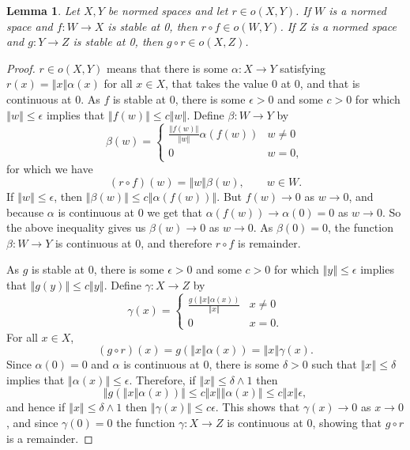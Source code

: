 \documentclass{article}
\newcommand{\norm}[1]{\left\Vert #1 \right\Vert}
\newtheorem{lemma}[theorem]{Lemma}
\theoremstyle{definition}
\begin{document}
\begin{lemma}
Let $X,Y$ be normed spaces and let $r \in o(X,Y)$. 
If $W$ is a normed space and $f:W \to X$ is stable at 0, then $r \circ f \in o(W,Y)$. If $Z$ is a normed space
and $g:Y \to Z$ is stable at 0, then $g \circ r \in o(X,Z)$.
 \label{stable}
\end{lemma}
\begin{proof}
$r \in o(X,Y)$ means that there is some $\alpha:X \to Y$ satisfying  $r(x)=\norm{x}\alpha(x)$ for all
$x \in X$, that takes the value $0$ at $0$, and that is continuous at $0$.
As $f$ is stable at $0$, there is some $\epsilon>0$ and some $c>0$ for which $\norm{w} \leq \epsilon$ implies that
$\norm{f(w)} \leq c \norm{w}$. 
Define $\beta:W \to Y$ by
\[
\beta(w)=\begin{cases}
\frac{\norm{f(w)}}{\norm{w}} \alpha(f(w))&w \neq 0\\
0&w=0,
\end{cases}
\]
for which we have
\[
(r \circ f)(w)=\norm{w}\beta(w), \qquad w \in W.
\]
If 
$\norm{w} \leq \epsilon$, then
$\norm{\beta(w)} \leq c \norm{\alpha(f(w))}$.
But $f(w) \to 0$ as $w \to 0$, and
 because $\alpha$ is continuous at $0$ we get that $\alpha(f(w)) \to \alpha(0)=0$ as $w \to 0$.
So the above inequality gives us $\beta(w) \to 0$ as $w \to 0$. As  $\beta(0)=0$, the function $\beta:W \to Y$ is continuous at $0$, and therefore
 $r \circ f$ is remainder.


As $g$ is stable at $0$, there is some $\epsilon>0$ and some $c>0$ for which $\norm{y} \leq \epsilon$ implies that
$\norm{g(y)} \leq c \norm{y}$. 
Define $\gamma:X \to Z$ by
\[
\gamma(x)
=\begin{cases}
\frac{g(\norm{x}\alpha(x))}{\norm{x}}&x \neq 0\\
0&x=0.
\end{cases}
\]
For all $x \in X$,
\[
(g \circ r)(x) = g(\norm{x}\alpha(x)) = \norm{x} \gamma(x).
\]
Since $\alpha(0) = 0$ and $\alpha$ is continuous at $0$, there is some $\delta>0$ such that
$\norm{x} \leq \delta$ implies that $\norm{\alpha(x)} \leq \epsilon$. Therefore, if
$\norm{x} \leq \delta \wedge 1$ then
\[
\norm{g(\norm{x}\alpha(x))} \leq c \norm{x} \norm{\alpha(x)} \leq c \norm{x} \epsilon,
\]
and hence if $\norm{x} \leq \delta \wedge 1$ then $\norm{\gamma(x)} \leq c\epsilon$. This shows that
$\gamma(x) \to 0$ as $x \to 0$, and since $\gamma(0)=0$  the function $\gamma:X \to Z$ is continuous at $0$, showing that $g \circ r$ is a remainder.
\end{proof}
\end{document}
